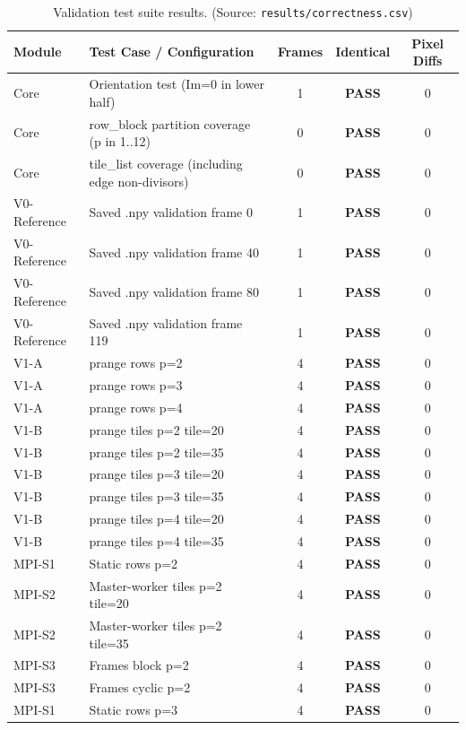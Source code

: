 \begin{table}[htbp]
\centering
\small
\caption{Validation test suite results. (Source: \texttt{results/correctness.csv})}
\label{tab:correctness}
\begin{tabular}{llccc}
\toprule
\textbf{Module} & \textbf{Test Case / Configuration} & \textbf{Frames} & \textbf{Identical} & \textbf{Pixel Diffs} \\
\midrule
Core & Orientation test (Im=0 in lower half) & 1 & \textbf{PASS} & 0 \\
Core & row\_block partition coverage (p in 1..12) & 0 & \textbf{PASS} & 0 \\
Core & tile\_list coverage (including edge non-divisors) & 0 & \textbf{PASS} & 0 \\
V0-Reference & Saved .npy validation frame 0 & 1 & \textbf{PASS} & 0 \\
V0-Reference & Saved .npy validation frame 40 & 1 & \textbf{PASS} & 0 \\
V0-Reference & Saved .npy validation frame 80 & 1 & \textbf{PASS} & 0 \\
V0-Reference & Saved .npy validation frame 119 & 1 & \textbf{PASS} & 0 \\
V1-A & prange rows p=2 & 4 & \textbf{PASS} & 0 \\
V1-A & prange rows p=3 & 4 & \textbf{PASS} & 0 \\
V1-A & prange rows p=4 & 4 & \textbf{PASS} & 0 \\
V1-B & prange tiles p=2 tile=20 & 4 & \textbf{PASS} & 0 \\
V1-B & prange tiles p=2 tile=35 & 4 & \textbf{PASS} & 0 \\
V1-B & prange tiles p=3 tile=20 & 4 & \textbf{PASS} & 0 \\
V1-B & prange tiles p=3 tile=35 & 4 & \textbf{PASS} & 0 \\
V1-B & prange tiles p=4 tile=20 & 4 & \textbf{PASS} & 0 \\
V1-B & prange tiles p=4 tile=35 & 4 & \textbf{PASS} & 0 \\
MPI-S1 & Static rows p=2 & 4 & \textbf{PASS} & 0 \\
MPI-S2 & Master-worker tiles p=2 tile=20 & 4 & \textbf{PASS} & 0 \\
MPI-S2 & Master-worker tiles p=2 tile=35 & 4 & \textbf{PASS} & 0 \\
MPI-S3 & Frames block p=2 & 4 & \textbf{PASS} & 0 \\
MPI-S3 & Frames cyclic p=2 & 4 & \textbf{PASS} & 0 \\
MPI-S1 & Static rows p=3 & 4 & \textbf{PASS} & 0 \\

\end{tabular}
\end{table}
